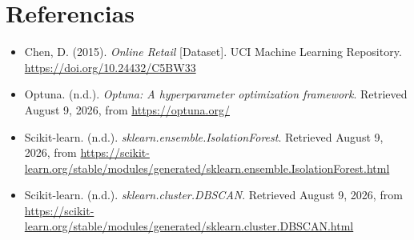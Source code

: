 \documentclass[11pt]{article}
\begin{document}
\section*{Referencias}

\begin{itemize}
    \item Chen, D. (2015). \textit{Online Retail} [Dataset]. UCI Machine Learning Repository. \url{https://doi.org/10.24432/C5BW33}
    \item Optuna. (n.d.). \textit{Optuna: A hyperparameter optimization framework}. Retrieved August 9, 2026, from \url{https://optuna.org/}
    \item Scikit-learn. (n.d.). \textit{sklearn.ensemble.IsolationForest}. Retrieved August 9, 2026, from \url{https://scikit-learn.org/stable/modules/generated/sklearn.ensemble.IsolationForest.html}
    \item Scikit-learn. (n.d.). \textit{sklearn.cluster.DBSCAN}. Retrieved August 9, 2026, from \url{https://scikit-learn.org/stable/modules/generated/sklearn.cluster.DBSCAN.html}
\end{itemize}
\end{document}

